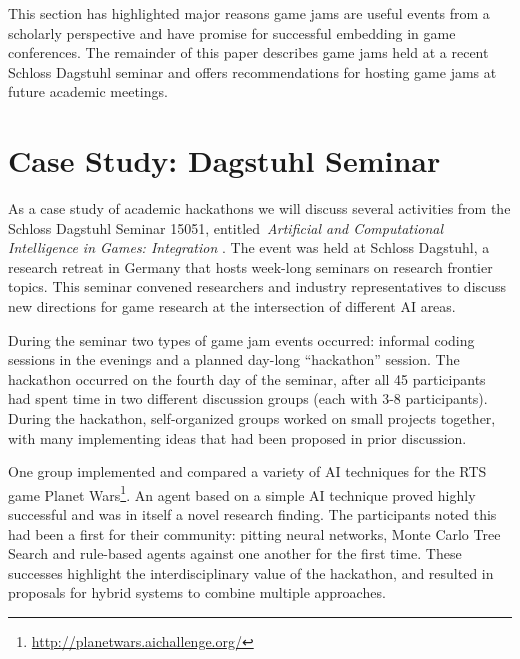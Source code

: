 \documentclass{acm_proc_article-sp}
\newcommand{\mytodo}[1]{\textbf{[[#1]]}}
\begin{document}

This section has highlighted major reasons game jams are useful events from a scholarly perspective and have promise for successful embedding in game conferences.
The remainder of this paper describes game jams held at a recent Schloss Dagstuhl seminar and offers recommendations for hosting game jams at future academic meetings.




\section{Case Study: Dagstuhl Seminar}
As a case study of academic hackathons we will discuss several activities from the Schloss Dagstuhl Seminar 15051, entitled~\textit{Artificial and Computational Intelligence in Games: Integration} \cite{lucas15dagstuhl}.
The event was held at Schloss Dagstuhl, a research retreat in Germany that hosts week-long seminars on research frontier topics.
This seminar convened researchers and industry representatives to discuss new directions for game research at the intersection of different AI areas.

During the seminar two types of game jam events occurred: informal coding sessions in the evenings and a planned day-long ``hackathon'' session.
The hackathon occurred on the fourth day of the seminar, after all 45 participants had spent time in two different discussion groups (each with 3-8 participants).
During the hackathon, self-organized groups worked on small projects together, with many implementing ideas that had been proposed in prior discussion.

One group implemented and compared a variety of AI techniques for the RTS game Planet Wars\footnote{\url{http://planetwars.aichallenge.org/}}.%
An agent based on a simple AI technique proved highly successful and was in itself a novel research finding.
The participants noted this had been a first for their community: pitting neural networks, Monte Carlo Tree Search and rule-based agents against one another for the first time.
These successes highlight the interdisciplinary value of the hackathon, and resulted in proposals for hybrid systems to combine multiple approaches.
\end{document}
